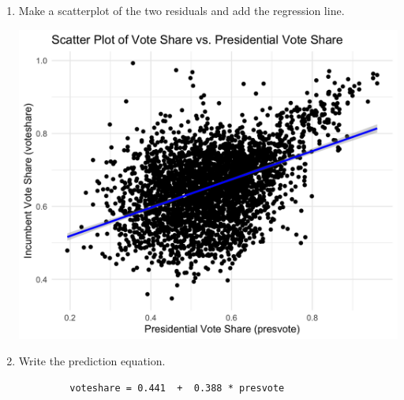 \documentclass[12pt,letterpaper]{article}
\begin{document}
\begin{enumerate}
		\item Make a scatterplot of the two residuals and add the regression line. 		
		 
		\includegraphics[width=.80\textwidth]{Scatterplot_4.2.png}
		\item Write the prediction equation.
		 
		 \begin{verbatim} 
		 voteshare = 0.441  +  0.388 * presvote
		\end{verbatim}	
	\end{enumerate}
	
\end{document}

